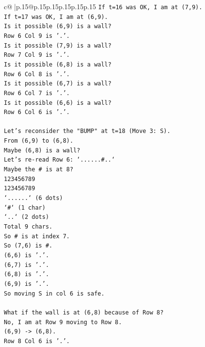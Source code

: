 \documentclass{article}
\begin{document}
{\begin{supertabular}{c@{$\;$}|p{.15\linewidth}@{}p{.15\linewidth}p{.15\linewidth}p{.15\linewidth}p{.15\linewidth}p{.15\linewidth}}
{{{\texttt{If t=16 was OK, I am at (7,9).} \\
\texttt{If t=17 was OK, I am at (6,9).} \\
\texttt{Is it possible (6,9) is a wall?} \\
\texttt{Row 6 Col 9 is '.'.} \\
\texttt{Is it possible (7,9) is a wall?} \\
\texttt{Row 7 Col 9 is '.'.} \\
\texttt{Is it possible (6,8) is a wall?} \\
\texttt{Row 6 Col 8 is '.'.} \\
\texttt{Is it possible (6,7) is a wall?} \\
\texttt{Row 6 Col 7 is '.'.} \\
\texttt{Is it possible (6,6) is a wall?} \\
\texttt{Row 6 Col 6 is '.'.} \\
\\ 
\texttt{Let's reconsider the "BUMP" at t=18 (Move 3: S).} \\
\texttt{From (6,9) to (6,8).} \\
\texttt{Maybe (6,8) is a wall?} \\
\texttt{Let's re{-}read Row 6: `......\#..`} \\
\texttt{Maybe the \# is at 8?} \\
\texttt{123456789} \\
\texttt{123456789} \\
\texttt{`......` (6 dots)} \\
\texttt{`\#` (1 char)} \\
\texttt{`..` (2 dots)} \\
\texttt{Total 9 chars.} \\
\texttt{So \# is at index 7.} \\
\texttt{So (7,6) is \#.} \\
\texttt{(6,6) is '.'.} \\
\texttt{(6,7) is '.'.} \\
\texttt{(6,8) is '.'.} \\
\texttt{(6,9) is '.'.} \\
\texttt{So moving S in col 6 is safe.} \\
\\ 
\texttt{What if the wall is at (6,8) because of Row 8?} \\
\texttt{No, I am at Row 9 moving to Row 8.} \\
\texttt{(6,9) {-}> (6,8).} \\
\texttt{Row 8 Col 6 is '.'.} \\
}}}
\end{supertabular}}
\end{document}
